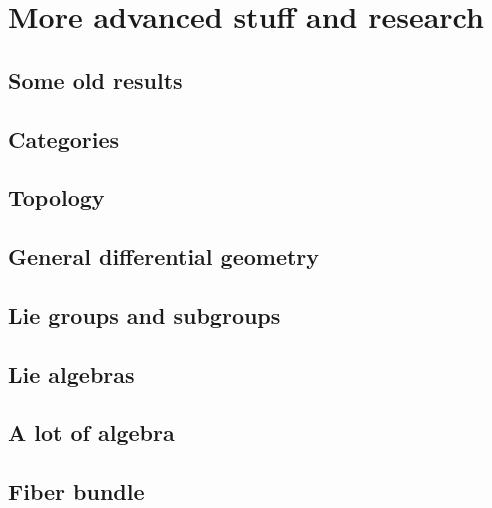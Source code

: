 
\emptyInputPath
{}

\part{More advanced stuff and research}



\chapter{Some old results}


\chapter{Categories}        \label{chap_category}


\chapter{Topology}              \label{chap_topology}



\chapter{General differential geometry} \label{Chapitre_FB}

 

\chapter{Lie groups and subgroups}


\chapter{Lie algebras}
  
 





\chapter{A lot of algebra}




\chapter{Fiber bundle}



